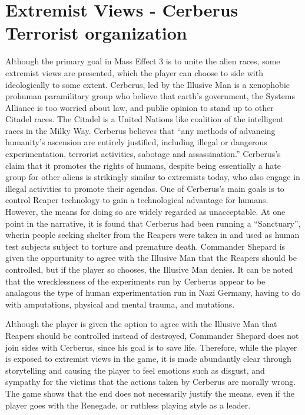 \documentclass[journal]{IEEEtran}
\begin{document}
\section{Extremist Views - Cerberus Terrorist organization}
Although the primary goal in Mass Effect 3 is to unite the alien races, some
extremist views are presented, which the player can choose to side
with ideologically to some extent. Cerberus, led by the Illusive Man is
a xenophobic prohuman paramilitary group \cite{chrisb}\cite{wikia}
who believe that earth's government, the Systems Alliance is too
worried about law, and public opinion to stand up to other Citadel races.
The Citadel is a United Nations like coalition of the intelligent races in the Milky Way. Cerberus believes that ``any methods of advancing humanity's ascension are entirely justified, including illegal or dangerous experimentation, terrorist activities, sabotage and assassination.''\cite{wikia}
Cerberus's claim that it promotes the rights of humans, despite being
essentially a hate group for other aliens is strikingly similar to
extremists today, who also engage in illegal activities
to promote their agendas.
One of
Cerberus's main goals is to control Reaper technology to gain a technological
advantage for humans. However, the means for doing so are widely regarded as unacceptable. At one point in the narrative, it is found that Cerberus
had been running a ``Sanctuary'', wherin people seeking
shelter from the Reapers were taken in and used as human test subjects
subject to torture and premature death. Commander Shepard is given the opportunity to agree with the Illusive Man that the Reapers should be controlled, but if the player so chooses, the Illusive Man denies.
It can be noted that the wrecklessness of the experiments run by Cerberus
appear to be analagous the type of human experimentation run in
Nazi Germany, having to do with amputations, physical and mental trauma, and mutations.

Although the player is given the option to agree with the Illusive Man that Reapers should
be controlled instead of destroyed, Commander
Shepard does not join sides with Cerberus, since his goal is to save life.
Therefore, while the player is exposed to extremist views in the game,
it is made abundantly clear through storytelling and causing the player to feel
emotions such as disgust, and sympathy for the victims that the actions taken by Cerberus are morally wrong. The game shows that the end does not necessarily justify
the means, even if the player goes with the Renegade, or ruthless playing style
as a leader.
\end{document}
